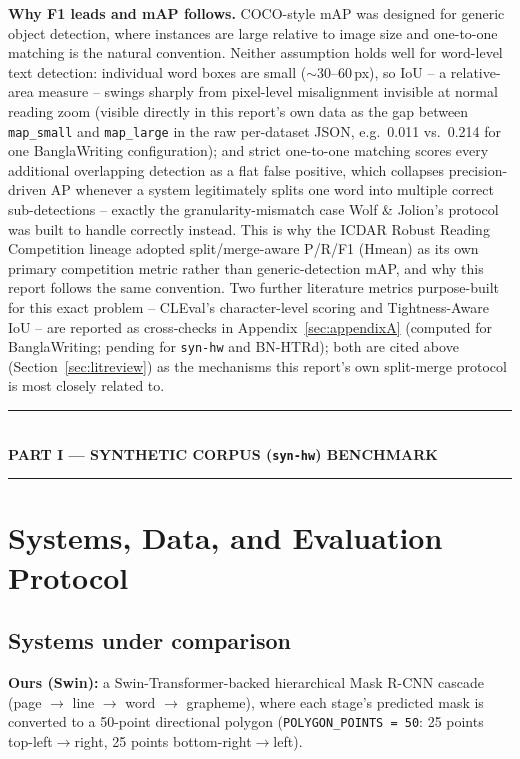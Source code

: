 \documentclass[11pt]{article}
\newcommand{\partbanner}[1]{%
\bigskip
\begin{center}
\rule{0.96\linewidth}{1.1pt}\\[5pt]
{\Large\bfseries #1}\\[3pt]
\rule{0.96\linewidth}{1.1pt}
\end{center}
\bigskip
}
\begin{document}
\textbf{Why F1 leads and mAP follows.} COCO-style mAP was designed for generic object
detection, where instances are large relative to image size and one-to-one matching is
the natural convention. Neither assumption holds well for word-level text detection:
individual word boxes are small ($\sim$30--60\,px), so IoU -- a relative-area measure --
swings sharply from pixel-level misalignment invisible at normal reading zoom (visible
directly in this report's own data as the gap between \texttt{map\_small} and
\texttt{map\_large} in the raw per-dataset JSON, e.g.\ 0.011 vs.\ 0.214 for one
BanglaWriting configuration); and strict one-to-one matching scores every additional
overlapping detection as a flat false positive, which collapses precision-driven AP
whenever a system legitimately splits one word into multiple correct sub-detections --
exactly the granularity-mismatch case Wolf \& Jolion's protocol was built to handle
correctly instead. This is why the ICDAR Robust Reading Competition lineage
\cite{shahab2011icdar2011,karatzas2013icdar2013,karatzas2015icdar2015} adopted
split/merge-aware P/R/F1 (Hmean) as its own primary competition metric rather than
generic-detection mAP, and why this report follows the same convention. Two further
literature metrics purpose-built for this exact problem -- CLEval's character-level
scoring \cite{baek2020cleval} and Tightness-Aware IoU \cite{liu2019tiou} -- are reported
as cross-checks in Appendix~\ref{sec:appendixA} (computed for BanglaWriting; pending for
\texttt{syn-hw} and BN-HTRd); both are cited above
(Section~\ref{sec:litreview}) as the mechanisms this report's own split-merge protocol is
most closely related to.

\partbanner{PART I --- SYNTHETIC CORPUS (\texttt{syn-hw}) BENCHMARK}

\section{Systems, Data, and Evaluation Protocol}
\label{sec:method}

\subsection{Systems under comparison}

\textbf{Ours (Swin):} a Swin-Transformer-backed hierarchical Mask R-CNN cascade
(page $\to$ line $\to$ word $\to$ grapheme), where each stage's predicted mask is
converted to a 50-point directional polygon (\texttt{POLYGON\_POINTS = 50}: 25 points
top-left$\to$right, 25 points bottom-right$\to$left).
\end{document}

